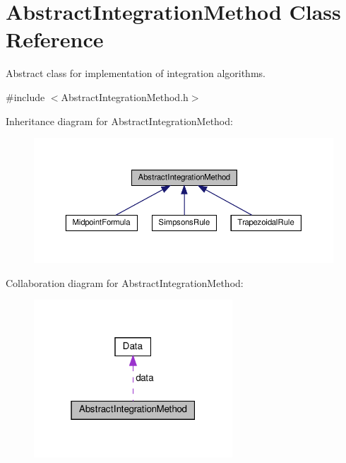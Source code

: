 \hypertarget{class_abstract_integration_method}{}\section{Abstract\+Integration\+Method Class Reference}
\label{class_abstract_integration_method}


Abstract class for implementation of integration algorithms.  




{\ttfamily \#include $<$Abstract\+Integration\+Method.\+h$>$}



Inheritance diagram for Abstract\+Integration\+Method\+:
\nopagebreak
\begin{figure}[H]
\begin{center}
\leavevmode
\includegraphics[width=350pt]{class_abstract_integration_method__inherit__graph}
\end{center}
\end{figure}


Collaboration diagram for Abstract\+Integration\+Method\+:\nopagebreak
\begin{figure}[H]
\begin{center}
\leavevmode
\includegraphics[width=211pt]{class_abstract_integration_method__coll__graph}
\end{center}
\end{figure}
